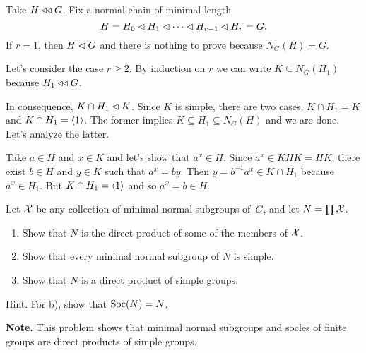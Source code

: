 \begin{solution} Take $H\mathrel{\triangleleft\triangleleft} G$. Fix a normal chain of minimal length
$$
    H=H_0\lhd H_1\lhd\cdots\lhd H_{r-1}\lhd H_r=G.
$$
If $r=1$, then $H\lhd G$ and there is nothing to prove because $N_G(H)=G$.

Let's consider the case $r\ge2$. By induction on $r$ we can write $K\subseteq N_G(H_1)$ because $H_1\mathrel{\triangleleft\triangleleft} G$.

In consequence, $K\cap H_1\lhd K$. Since $K$ is simple, there are two cases, $K\cap H_1=K$ and $K\cap H_1=\langle1\rangle$. The former implies $K\subseteq H_1\subseteq N_G(H)$ and we are done. Let's analyze the latter.

Take $a\in H$ and $x\in K$ and let's show that $a^x\in H$. Since $a^x \in KHK=HK$, there exist $b\in H$ and $y\in K$ such that $a^x=by$. Then $y=b^{-1}a^x\in K\cap H_1$ because $a^x\in H_1$. But $K\cap H_1=\langle1\rangle$ and so $a^x=b\in H$.  \end{solution}

\begin{probl}\label{problem-2.A.5}
    Let $\cal X$ be any collection of minimal normal subgroups of\/~$G$, and let\/ $N = \prod\cal X$.
    \begin{enumerate}[\rm a)]
    \item Show that\/ $N$ is the direct product of some of the members of\/ $\cal X$.
    \item Show that every minimal normal subgroup of\/ $N$ is simple.
    \item Show that\/ $N$ is a direct product of simple groups.
    \end{enumerate}
    \textrm{\rm Hint. For b), show that ${\rm Soc}(N) = N$.}

    \textrm{\rm\textbf{Note.} This problem shows that minimal normal subgroups and socles of finite groups are direct products of simple groups.}
\end{probl}


